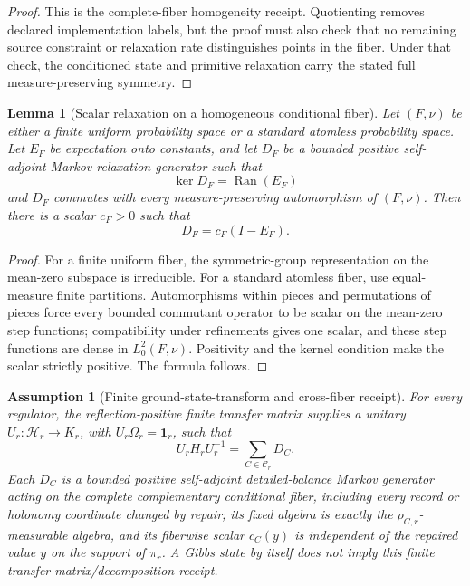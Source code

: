 \documentclass[11pt]{article}
\numberwithin{equation}{section}
\newtheorem{lemma}[theorem]{Lemma}
\newtheorem{assumption}[theorem]{Assumption}
\theoremstyle{remark}
\newcommand{\Hcal}{\mathcal H}
\begin{document}
\begin{proof}
This is the complete-fiber homogeneity receipt. Quotienting removes declared implementation
labels, but the proof must also check that no remaining source constraint or relaxation rate
distinguishes points in the fiber. Under that check, the conditioned state and primitive
relaxation carry the stated full measure-preserving symmetry.
\end{proof}

\begin{lemma}[Scalar relaxation on a homogeneous conditional fiber]
\label{lem:scalar-relaxation}
Let \((F,\nu)\) be either a finite uniform probability space or a standard atomless probability
space. Let \(E_F\) be expectation onto constants, and let \(D_F\) be a bounded positive
self-adjoint Markov relaxation generator such that
\[
\ker D_F=\operatorname{Ran}(E_F)
\]
and \(D_F\) commutes with every measure-preserving automorphism of \((F,\nu)\). Then there is a scalar
\(c_F>0\) such that
\[
D_F=c_F(I-E_F).
\]
\end{lemma}

\begin{proof}
For a finite uniform fiber, the symmetric-group representation on the mean-zero subspace is
irreducible. For a standard atomless fiber, use equal-measure finite partitions. Automorphisms
within pieces and permutations of pieces force every bounded commutant operator to be scalar on
the mean-zero step functions; compatibility under refinements gives one scalar, and these step
functions are dense in \(L^2_0(F,\nu)\). Positivity and the kernel condition make the scalar
strictly positive. The formula follows.
\end{proof}

\begin{assumption}[Finite ground-state-transform and cross-fiber receipt]
\label{ass:finite-transfer-receipt}
For every regulator, the reflection-positive finite transfer matrix supplies a unitary
\(U_r:\Hcal_r\to K_r\), with \(U_r\Omega_r=\mathbf 1_r\), such that
\[
U_rH_rU_r^{-1}=\sum_{C\in\mathcal C_r}D_C.
\]
Each \(D_C\) is a bounded positive self-adjoint detailed-balance Markov generator acting on the
complete complementary conditional fiber, including every record or holonomy coordinate changed
by repair; its fixed algebra is exactly the
\(\rho_{C,r}\)-measurable algebra, and its fiberwise scalar \(c_C(y)\) is independent of the
repaired value \(y\) on the support of \(\pi_r\). A Gibbs state by itself does not imply this
finite transfer-matrix/decomposition receipt.
\end{assumption}
\end{document}
